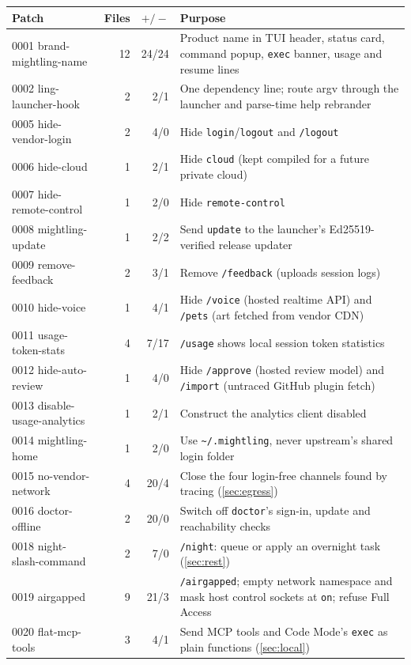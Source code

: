 \documentclass[11pt]{article}
\newcommand{\code}[1]{\texttt{#1}}
\begin{document}
\begin{table}[tbp]
\centering
\scriptsize
\begin{tabularx}{\linewidth}{@{}l r r X@{}}
\toprule
Patch & Files & $+/-$ & Purpose \\
\midrule
0001 brand-mightling-name & 12 & 24/24 & Product name in TUI header, status card, command popup, \code{exec} banner, usage and resume lines \\
0002 ling-launcher-hook & 2 & 2/1 & One dependency line; route argv through the launcher and parse-time help rebrander \\
0005 hide-vendor-login & 2 & 4/0 & Hide \code{login}/\code{logout} and \code{/logout} \\
0006 hide-cloud & 1 & 2/1 & Hide \code{cloud} (kept compiled for a future private cloud) \\
0007 hide-remote-control & 1 & 2/0 & Hide \code{remote-control} \\
0008 mightling-update & 1 & 2/2 & Send \code{update} to the launcher's Ed25519-verified release updater \\
0009 remove-feedback & 2 & 3/1 & Remove \code{/feedback} (uploads session logs) \\
0010 hide-voice & 1 & 4/1 & Hide \code{/voice} (hosted realtime API) and \code{/pets} (art fetched from vendor CDN) \\
0011 usage-token-stats & 4 & 7/17 & \code{/usage} shows local session token statistics \\
0012 hide-auto-review & 1 & 4/0 & Hide \code{/approve} (hosted review model) and \code{/import} (untraced GitHub plugin fetch) \\
0013 disable-usage-analytics & 1 & 2/1 & Construct the analytics client disabled \\
0014 mightling-home & 1 & 2/0 & Use \code{\textasciitilde/.mightling}, never upstream's shared login folder \\
0015 no-vendor-network & 4 & 20/4 & Close the four login-free channels found by tracing (\cref{sec:egress}) \\
0016 doctor-offline & 2 & 20/0 & Switch off \code{doctor}'s sign-in, update and reachability checks \\
0018 night-slash-command & 2 & 7/0 & \code{/night}: queue or apply an overnight task (\cref{sec:rest}) \\
0019 airgapped & 9 & 21/3 & \code{/airgapped}; empty network namespace and mask host control sockets at \code{on}; refuse Full Access \\
0020 flat-mcp-tools & 3 & 4/1 & Send MCP tools and Code Mode's \code{exec} as plain functions (\cref{sec:local}) \\

\end{tabularx}
\end{table}
\end{document}
